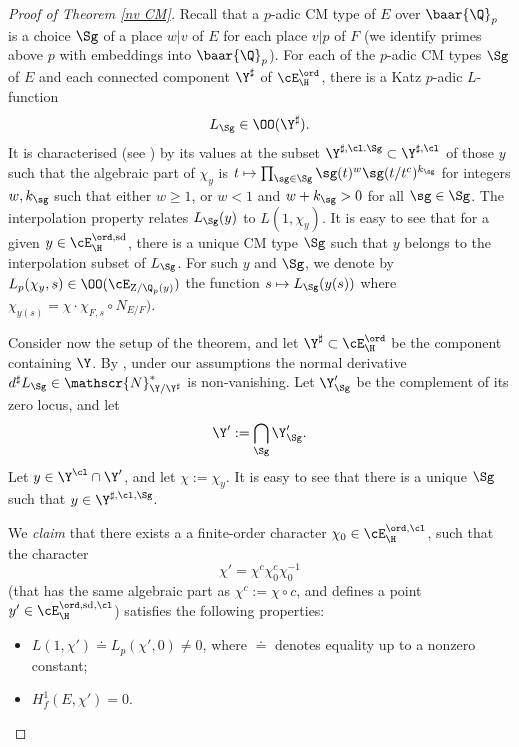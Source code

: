 \begin{proof}[Proof of Theorem \ref{nv CM}] Recall that a $p$-adic CM type of $E$ over  $\baar{\Q}_{p}$ is a choice   $\Sg$ of a place $w\vert v$ of $E$ for each place $v\vert p$ of $F$ (we identify primes above $p$ with embeddings into   $\baar{\Q}_{p}$). For each of the $p$-adic CM types $\Sg$ of $E$ and each connected component $\Y^{\sharp}$ of $\cE^{\ord}_{\H}$,  there is a Katz $p$-adic $L$-function
$$L_{\Sg} \in \OO(\Y^{\sharp}).$$
It is characterised (see \cite{katz,HT}) by its  values at the subset $\Y^{\sharp, \cl.\Sg}\subset \Y^{\sharp, \cl}$ of those $y$ such that  the algebraic part of $\chi_{y}$ is   $t\mapsto\prod_{\sg\in \Sg} \sg(t)^{w} \sg(t/t^{c})^{k_{\sg}}$ for integers $w,  k_{\sg}$ such that either $w\geq 1$, or  $w<1$ and $w+k_{\sg}>0$ for all $\sg\in \Sg$. The interpolation property relates $L_{\Sg}(y)$ to $L(1, \chi_{y})$. It is easy to see that for  a given $y\in \cE^{\ord, \rm sd}_{\H}$, there is a unique CM type $\Sg$ such that $y$ belongs to the interpolation subset of $L_{\Sg}$. For such $y$ and $\Sg$,  we denote by $L_{p}(\chi_{y}, s)\in \OO(\cE_{{\rm Z}/\Q_{p}(y)})$ the function $s \mapsto L_{\Sg}(y(s))$ where $\chi_{y(s)}=\chi\cdot \chi_{F,s}\circ N_{E/F})$.


Consider now the setup of the theorem, and  let $\Y^{\sharp}\subset \cE_{\H}^{\ord}$ be the component containing $\Y$.
By \cite{ashay}, under our assumptions the normal derivative $d^{\sharp} L_{\Sg}\in \mathscr{N}^{*}_{\Y/\Y^{\sharp}}$ is non-vanishing. Let $\Y'_{\Sg}$ be the complement of its zero locus, and let $$\Y':=\bigcap_{\Sg} \Y_{ \Sg}'.$$
 Let $y\in \Y^{\cl}\cap \Y'$, and let $\chi:=\chi_{y}$. It is easy to see that there is a unique $\Sg$ such that $y\in \Y^{\sharp, \cl , \Sg}$.

 We \emph{claim} that there exists a a finite-order character $\chi_{0}\in \cE_{\H}^{\ord, \cl}$, such that  the character
 $$\chi'= \chi^{c} \chi_{0}^{c}\chi_{0}^{-1} $$
 (that has  the same algebraic part as $\chi^{c}:=\chi\circ c$, and    defines a point $y'\in \cE_{\H}^{\ord, {\rm sd}, \cl}$) satisfies the following properties:
\begin{itemize}
 \item $L(1, \chi')\doteq L_{p}(\chi', 0)\neq 0$, where $\doteq $ denotes equality up to a nonzero constant;
 \item $H^{1}_{f}(E, \chi')=0$.
 \end{itemize}



\end{proof}
